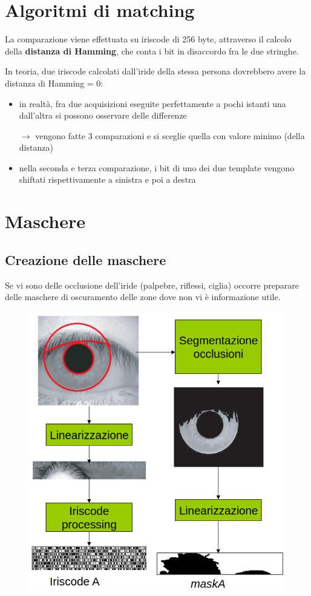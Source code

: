 \documentclass{report}
\begin{document}
\section{Algoritmi di matching}
La comparazione viene effettuata su iriscode di 256 byte, attraverso 
il calcolo della \textbf{distanza di Hamming}, che conta i bit 
in disaccordo fra le due stringhe.

\noindent In teoria, due iriscode calcolati dall'iride della stessa persona
dovrebbero avere la distanza di Hamming = 0:
\begin{itemize}
    \item in realtà, fra due acquisizioni eseguite perfettamente a pochi 
    istanti una dall'altra si possono osservare delle differenze

    $\rightarrow$ vengono fatte 3 comparazioni e si sceglie quella con valore minimo (della distanza)
    \item nella seconda e terza comparazione, i bit di uno dei due template vengono shiftati rispettivamente a sinistra e poi a destra
\end{itemize}

\section{Maschere}

\subsection{Creazione delle maschere}
Se vi sono delle occlusione dell'iride (palpebre, riflessi, ciglia) occorre 
preparare delle maschere di oscuramento delle zone dove non vi è 
informazione utile.

\begin{figure}[ht]
    \centering
    \includegraphics[width=0.5\linewidth]{images/creazione-maschere.png}
\end{figure}
\end{document}
